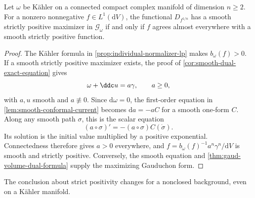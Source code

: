 \begin{corollary}\label{cor:kahler-smooth-dual-attainment}
Let $\omega$ be K\"ahler on a connected compact complex manifold of dimension $n\geq2$. For a nonzero nonnegative $f\in L^1(\mathrm{d}V)$, the functional $D_{f^{1/n}}$ has a smooth strictly positive maximizer in $\mathscr G_\omega$ if and only if $f$ agrees almost everywhere with a smooth strictly positive function.
\end{corollary}
\begin{proof}
The K\"ahler formula in \cref{prop:individual-normalizer-lp} makes $b_\omega(f)>0$. If a smooth strictly positive maximizer exists, the proof of \cref{cor:smooth-dual-exact-equation} gives
\[
 \omega+\ddc u=a\gamma,
 \qquad a\geq0,
\]
with $a,u$ smooth and $a\not\equiv0$. Since $\mathrm{d}\omega=0$, the first-order equation in \cref{lem:smooth-conformal-current} becomes $\mathrm{d}a=-aC$ for a smooth one-form $C$. Along any smooth path $\sigma$, this is the scalar equation
\[
 (a\circ\sigma)'=-(a\circ\sigma)C(\dot\sigma).
\]
Its solution is the initial value multiplied by a positive exponential. Connectedness therefore gives $a>0$ everywhere, and $f=b_\omega(f)^{-1}a^n\gamma^n/\mathrm{d}V$ is smooth and strictly positive. Conversely, the smooth equation and \cref{thm:gaud-volume-dual-formula} supply the maximizing Gauduchon form.
\end{proof}

The conclusion about strict positivity changes for a nonclosed background, even on a K\"ahler manifold.

